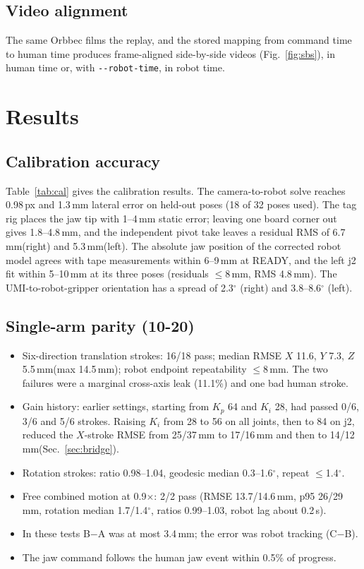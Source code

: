 \documentclass[conference,10pt]{IEEEtran}
\newcommand{\mm}{\,mm\xspace}
\begin{document}
\subsection{Video alignment}\label{sec:video}
The same Orbbec films the replay, and the stored mapping from command time to human time produces frame-aligned
side-by-side videos (Fig.~\ref{fig:sbs}), in human time or, with \texttt{-{}-robot-time}, in robot time.

\section{Results}\label{sec:res}
\subsection{Calibration accuracy}\label{sec:rescal}
Table~\ref{tab:cal} gives the calibration results. The camera-to-robot solve reaches 0.98\,px and 1.3\mm lateral error on
held-out poses (18 of 32 poses used). The tag rig places the jaw tip with 1--4\mm static error; leaving one board corner
out gives 1.8--4.8\mm, and the independent pivot take leaves a residual RMS of 6.7\mm (right) and 5.3\mm (left). The
absolute jaw position of the corrected robot model agrees with tape measurements within 6--9\mm at READY, and the left
j2 fit within 5--10\mm at its three poses (residuals $\le$8\mm, RMS 4.8\mm). The UMI-to-robot-gripper orientation has a
spread of 2.3$^\circ$ (right) and 3.8--8.6$^\circ$ (left).

\subsection{Single-arm parity (10-20)}\label{sec:res1arm}
\begin{itemize}
\item Six-direction translation strokes: 16/18 pass; median RMSE $X$ 11.6, $Y$ 7.3, $Z$ 5.5\mm (max 14.5\mm); robot
  endpoint repeatability $\le$8\mm. The two failures were a marginal cross-axis leak (11.1\%) and one bad human stroke.
\item Gain history: earlier settings, starting from $K_p$ 64 and $K_i$ 28, had passed 0/6, 3/6 and 5/6 strokes. Raising
  $K_i$ from 28 to 56 on all joints, then to 84 on j2, reduced the $X$-stroke RMSE from 25/37\mm to 17/16\mm and then to
  14/12\mm (Sec.~\ref{sec:bridge}).
\item Rotation strokes: ratio 0.98--1.04, geodesic median 0.3--1.6$^\circ$, repeat $\le$1.4$^\circ$.
\item Free combined motion at 0.9$\times$: 2/2 pass (RMSE 13.7/14.6\mm, p95 26/29\mm, rotation median 1.7/1.4$^\circ$,
  ratios 0.99--1.03, robot lag about 0.2\,s).
\item In these tests B$-$A was at most 3.4\mm; the error was robot tracking (C$-$B).
\item The jaw command follows the human jaw event within 0.5\% of progress.
\end{itemize}
\end{document}
